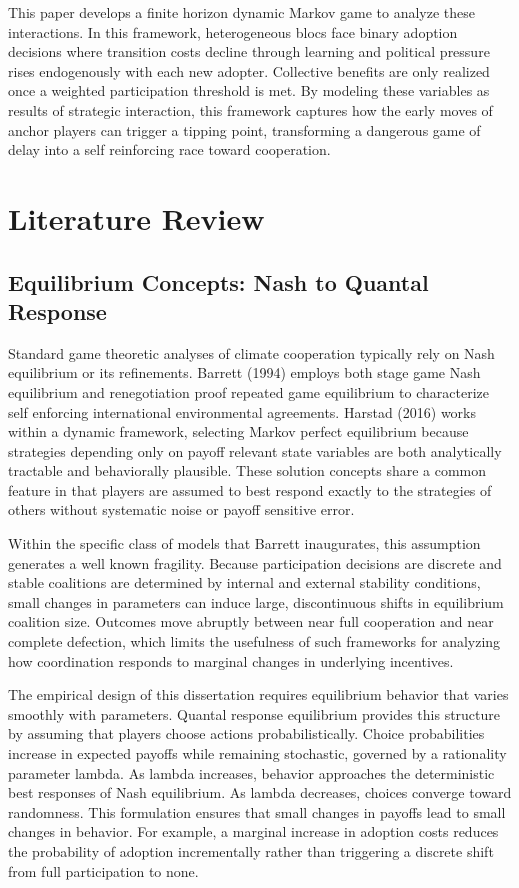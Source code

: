 \documentclass[12pt,a4paper]{article}
\begin{document}
This paper develops a finite horizon dynamic Markov game to analyze these interactions. In this framework, heterogeneous blocs face binary adoption decisions where transition costs decline through learning and political pressure rises endogenously with each new adopter. Collective benefits are only realized once a weighted participation threshold is met. By modeling these variables as results of strategic interaction, this framework captures how the early moves of anchor players can trigger a tipping point, transforming a dangerous game of delay into a self reinforcing race toward cooperation.

\section{Literature Review}

\subsection{Equilibrium Concepts: Nash to Quantal Response}

Standard game theoretic analyses of climate cooperation typically rely on Nash equilibrium or its refinements. Barrett (1994) employs both stage game Nash equilibrium and renegotiation proof repeated game equilibrium to characterize self enforcing international environmental agreements. Harstad (2016) works within a dynamic framework, selecting Markov perfect equilibrium because strategies depending only on payoff relevant state variables are both analytically tractable and behaviorally plausible. These solution concepts share a common feature in that players are assumed to best respond exactly to the strategies of others without systematic noise or payoff sensitive error.

Within the specific class of models that Barrett inaugurates, this assumption generates a well known fragility. Because participation decisions are discrete and stable coalitions are determined by internal and external stability conditions, small changes in parameters can induce large, discontinuous shifts in equilibrium coalition size. Outcomes move abruptly between near full cooperation and near complete defection, which limits the usefulness of such frameworks for analyzing how coordination responds to marginal changes in underlying incentives.

The empirical design of this dissertation requires equilibrium behavior that varies smoothly with parameters. Quantal response equilibrium provides this structure by assuming that players choose actions probabilistically. Choice probabilities increase in expected payoffs while remaining stochastic, governed by a rationality parameter lambda. As lambda increases, behavior approaches the deterministic best responses of Nash equilibrium. As lambda decreases, choices converge toward randomness. This formulation ensures that small changes in payoffs lead to small changes in behavior. For example, a marginal increase in adoption costs reduces the probability of adoption incrementally rather than triggering a discrete shift from full participation to none.
\end{document}
